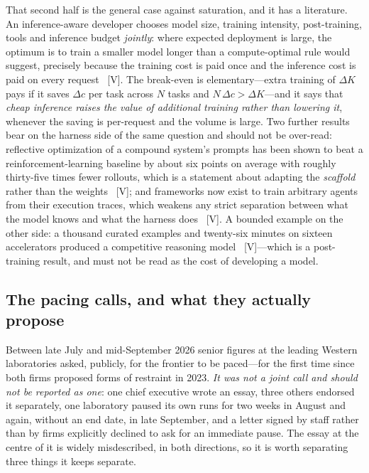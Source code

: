That second half is the general case against saturation, and it has a literature. An inference-aware developer chooses model size, training intensity, post-training, tools and inference budget \emph{jointly}: where expected deployment is large, the optimum is to train a smaller model longer than a compute-optimal rule would suggest, precisely because the training cost is paid once and the inference cost is paid on every request~\cite{beyond-chinchilla} [V]. The break-even is elementary---extra training of $\Delta K$ pays if it saves $\Delta c$ per task across $N$ tasks and $N\,\Delta c > \Delta K$---and it says that \emph{cheap inference raises the value of additional training rather than lowering it}, whenever the saving is per-request and the volume is large. Two further results bear on the harness side of the same question and should not be over-read: reflective optimization of a compound system's prompts has been shown to beat a reinforcement-learning baseline by about six points on average with roughly thirty-five times fewer rollouts, which is a statement about adapting the \emph{scaffold} rather than the weights~\cite{gepa} [V]; and frameworks now exist to train arbitrary agents from their execution traces, which weakens any strict separation between what the model knows and what the harness does~\cite{agent-lightning} [V]. A bounded example on the other side: a thousand curated examples and twenty-six minutes on sixteen accelerators produced a competitive reasoning model~\cite{s1} [V]---which is a post-training result, and must not be read as the cost of developing a model.

\subsection{The pacing calls, and what they actually propose}

Between late July and mid-September 2026 senior figures at the leading Western laboratories asked, publicly, for the frontier to be paced---for the first time since both firms proposed forms of restraint in 2023. \emph{It was not a joint call and should not be reported as one}: one chief executive wrote an essay, three others endorsed it separately, one laboratory paused its own runs for two weeks in August and again, without an end date, in late September, and a letter signed by staff rather than by firms explicitly declined to ask for an immediate pause. The essay at the centre of it is widely misdescribed, in both directions, so it is worth separating three things it keeps separate.


